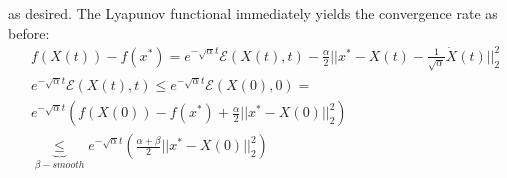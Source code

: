 as desired. The Lyapunov functional immediately yields the convergence rate as before:
\begin{align*}
    & f(X(t)) - f(x^*) = e^{-\sqrt{\alpha}t} \mathcal{E}(X(t), t) - \frac{\alpha}{2} ||x^*-X(t)-\frac{1}{\sqrt{\alpha}} \dot{X}(t)||_2^2 \\
    & e^{-\sqrt{\alpha}t} \mathcal{E}(X(t), t) \leq e^{-\sqrt{\alpha}t} \mathcal{E}(X(0), 0) =  \\
    & e^{-\sqrt{\alpha}t} \left(f(X(0))-f(x^*)+\frac{\alpha}{2}||x^*-X(0)||_2^2 \right) \\
    & \underbrace{\leq}_{\beta-smooth} e^{-\sqrt{\alpha}t} \left(\frac{\alpha+\beta}{2}||x^*-X(0)||_2^2 \right)
\end{align*}
 


